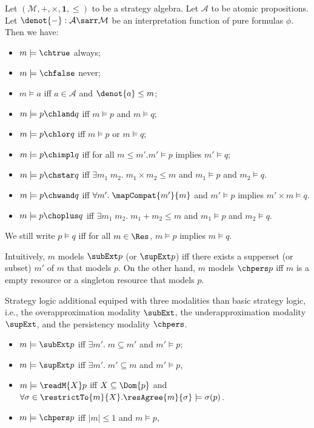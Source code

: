 \begin{definition} Let $(\mathcal{M},{+},{\times},\mathbf{1}, \leq)$ to be a strategy algebra. Let $\mathcal{A}$ to be atomic propositions. Let $\denot{-} : \mathcal{A} \sarr \mathcal{M}$ be an interpretation function of pure formulas $\phi$. Then we have:
\begin{itemize}
\item $m \models \chtrue$ always;
\item $m \models \chfalse$ never;
\item $m \models a$ iff $a \in \mathcal{A}$ and $\denot{a} \leq m$;
\item $m \models p \chland q$ iff $m \models p$ and $m \models q$;
\item $m \models p \chlor q$ iff $m \models p$ or $m \models q$;
\item $m \models p \chimpl q$ iff for all $m \leq m'. m' \models p$ implies $m' \models q$;
\item $m \models p \chstar q$ iff $\exists m_1\;m_2.\; m_1 \times m_2 \leq m$ and
  $m_1 \models p$ and $m_2 \models q$.
\item $m \models p \chwand q$ iff $\forall m'.\; \mapCompat{m'}{m}$ and $m' \models p$ implies
  $m' \times m \models q$.
\item $m \models p \choplus q$ iff $\exists m_1\;m_2.\; m_1 + m_2 \leq m$ and
  $m_1 \models p$ and $m_2 \models q$.
\end{itemize}
We still write $p \models q$ iff for all $m \in \Res$, $m \models p$ implies $m \models q$.
\end{definition}

Intuitively, $m$ models $\subExt p$ (or $\supExt p$) iff there exists a supperset (or subset) $m'$ of $m$ that models $p$. On the other hand, $m$ models $\chpers p$ iff $m$ is a empty resource or a singleton resource that models $p$.


\begin{definition}\label{def:strategy-logic-modalities} Strategy logic additional equiped with three modalities than basic strategy logic, i.e., the overapproximation modality $\subExt$, the underapproximation modality $\supExt$, and the persistency modality $\chpers$.
  \begin{itemize}
    \item $m \models \subExt p$ iff $\exists m'.\; m \subseteq m'$ and
      $m' \models p$;
    \item $m \models \supExt p$ iff $\exists m'.\; m' \subseteq m$ and
      $m' \models p$,
    \item $m \models \readM{X} p$ iff $X \subseteq \Dom{p}$ and $\forall \sigma \in \restrictTo{m}{X}. \resAgree{m}{\sigma} \models \sigma(p) $.
    \item $m \models \chpers p$ iff $|m| \leq 1$ and
      $m \models p$,
    \end{itemize}
\end{definition}

